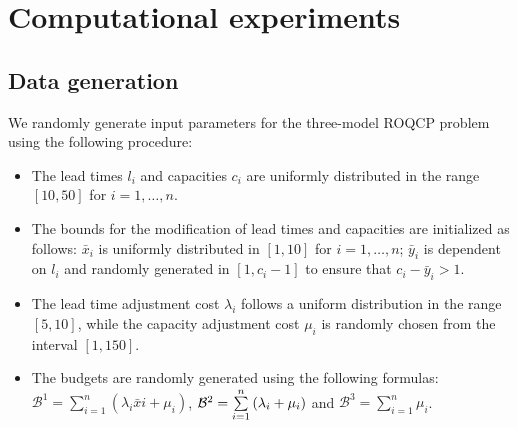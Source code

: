 \documentclass{article}
\theoremstyle{plain}
\begin{document}
\section*{Computational experiments} 

\subsection*{Data generation}
We randomly generate input parameters for the three-model ROQCP problem using the following procedure:

\begin{itemize}
    \item The lead times $l_i$ and capacities $c_i$ are uniformly distributed in the range $[10, 50]$ for $i = 1, \ldots, n$.
    \item The bounds for the modification of lead times and capacities are initialized as follows: $\bar{x}_i$ is uniformly distributed in $[1, 10]$ for $i = 1, \ldots, n$; $\bar{y}_i$ is dependent on $l_i$ and randomly generated in $[1, c_i - 1]$ to ensure that $c_i - \bar{y}_i > 1$.
    \item The lead time adjustment cost $\lambda_i$ follows a uniform distribution in the range $[5, 10]$, while the capacity adjustment cost $\mu_i$ is randomly chosen from the interval $[1, 150]$.
    \item The budgets are randomly generated using the following formulas: ${\mathcal{B}^1} = \sum\limits_{i=1}^n {(\lambda_i \bar{x}i + \mu_i)}$, ${{\cal B}^2} = \sum\limits_{i = 1}^n {({\lambda _i} + {\mu _i})} $ and ${\mathcal{B}^3} = \sum\limits_{i=1}^n {\mu_i}$.
\end{itemize}
\end{document}
